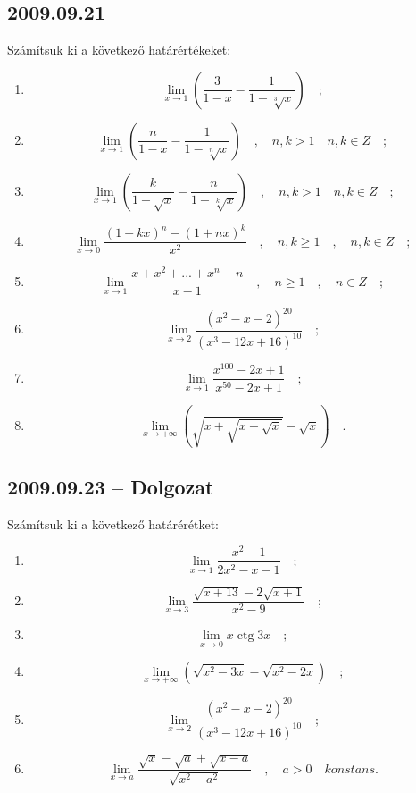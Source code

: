 \documentclass{article}
\newcommand{\ctg}{\mathop{\mathrm{ctg}}\nolimits}
\begin{document}
\subsection*{2009.09.21}
Számítsuk ki a következő határértékeket:
\begin{enumerate}
\item $$\lim_{x\to 1}\left(\frac{3}{1-x}-\frac{1}{1-\sqrt[3]{x}}\right)\quad;$$
\item $$\lim_{x\to 1}\left(\frac{n}{1-x}-\frac{1}{1-\sqrt[n]{x}}\right)\quad,\quad n,k>1\quad n,k\in{Z}\quad;$$
\item $$\lim_{x\to 1}\left(\frac{k}{1-\sqrt{x}}-\frac{n}{1-\sqrt[k]{x}}\right)\quad,\quad n,k>1\quad n,k\in{Z}\quad;$$
\item $$\lim_{x\to 0}\frac{\left(1+kx\right)^n-\left(1+nx\right)^k}{x^2}\quad,\quad n,k\geq 1\quad, \quad n,k\in{Z}\quad;$$
\item $$\lim_{x\to 1}\frac{x+x^2+...+x^n-n}{x-1}\quad,\quad n\geq1\quad,\quad n\in{Z}\quad;$$
\item $$\lim_{x\to 2}\frac{\left(x^2-x-2\right)^{20}}{\left(x^3-12x+16\right)^{10}}\quad;$$
\item $$\lim_{x\to 1}\frac{x^{100}-2x+1}{x^{50}-2x+1}\quad;$$
\item $$\lim_{x\to +\infty}\left(\sqrt{x+\sqrt{x+\sqrt{x}}}-\sqrt{x}\right)\quad.$$
\end{enumerate}
\subsection*{2009.09.23 -- Dolgozat}
Számítsuk ki a következő határérétket:
\begin{enumerate}
\item $$\lim_{x\to 1}\frac{x^2-1}{2x^2-x-1}\quad;$$
\item $$\lim_{x\to 3}\frac{\sqrt{x+13}-2\sqrt{x+1}}{x^2-9}\quad;$$
\item $$\lim_{x\to 0}x\ctg 3x\quad;$$
\item $$\lim_{x\to +\infty}\left(\sqrt{x^2-3x}-\sqrt{x^2-2x}\right)\quad;$$
\item $$\lim_{x\to 2}\frac{\left(x^2-x-2\right)^{20}}{\left(x^3-12x+16\right)^{10}}\quad;$$
\item $$\lim_{x\to a}\frac{\sqrt{x}-\sqrt{a}+\sqrt{x-a}}{\sqrt{x^2-a^2}}\quad,\quad a>0\quad konstans.$$
\end{enumerate}
\end{document}
